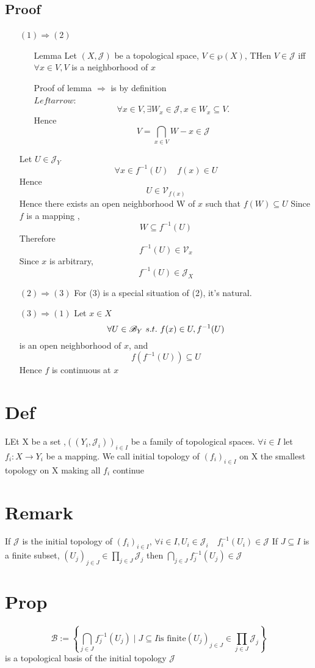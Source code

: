 \documentclass{book}
\begin{document}
\subsection*{Proof}
\begin{itemize}
    \item [$(1)\Rightarrow(2)$]\ 

    \begin{itemize}
    \item [Lemma] Let $(X,\mathcal{J})$ be a topological space, $V\in \wp(X)$, THen $V\in\mathcal{J}$ iff $\forall x\in V, V$ is a neighborhood of $x$
    \item [Proof of lemma]$\Rightarrow$ is by definition\\$Leftarrow$:$$\forall x\in V,\exists W_x\in \mathcal{J},x\in W_x\subseteq V.$$ 
    Hence $$V=\bigcap\limits_{x\in V}W-x\in \mathcal{J}$$
    \end{itemize}Let $U\in \mathcal{J}_Y$$$\forall x\in f^{-1}(U)\quad f(x)\in U$$Hence $$U\in \mathcal{V}_{f(x)}$$ 
    Hence there exists an open neighborhood W of $x$ such that $f(W)\subseteq U$ 
    Since $f$ is a mapping , $$W\subseteq f^{-1}(U)$$ Therefore $$f^{-1}(U)\in \mathcal{V}_x$$ 
    Since $x$ is arbitrary, $$f^{-1}(U)\in \mathcal{J}_X$$
    \item[$(2)\Rightarrow (3)$]For (3) is a special situation of (2), it's natural.
    \item[$(3)\Rightarrow (1)$]Let $x\in X$$$\forall U\in \mathscr{B}_Y\text\ { s.t. }\ f(x)\in U,f^{-1}(U)$$ is an open neighborhood of $x$, and $$f(f^{-1}(U))\subseteq U$$ Hence $f$ is continuous at $x$ 
\end{itemize}
\section{Def}
LEt X be a set ,$ ((Y_i,\mathcal{J}_i))_{i\in I}$ be a family of topological spaces. $\forall i\in I$ let $f_i:X\rightarrow Y_i$ be a mapping. We call initial topology of $(f_i)_{i\in I}$ on X the smallest topology on X making all $f_i$ continue
\section{Remark}
If $\mathcal{J}$ is the initial topology of $(f_i)_{i\in I}$, $\forall i\in I,U_i\in \mathcal{J}_i\quad f_i^{-1}(U_i)\in \mathcal{J}$ If $J\subseteq I$ is a finite subset, $(U_j)_{j\in J}\in \prod \limits_{j\in J}\mathcal{J}_j$ then $\bigcap\limits_{j\in J}f_j^{-1}(U_j)\in \mathcal{J}$
\section{Prop}
$$\mathscr{B}:=\left\{\bigcap\limits_{j\in J}f_j^{-1}(U_j)\mid J\subseteq I \text{is finite} (U_j)_{j\in J}\in\prod\limits_{j\in J}\mathcal{J}_j\right\}$$ is a topological basis of the initial topology $\mathcal{J}$
\end{document}
